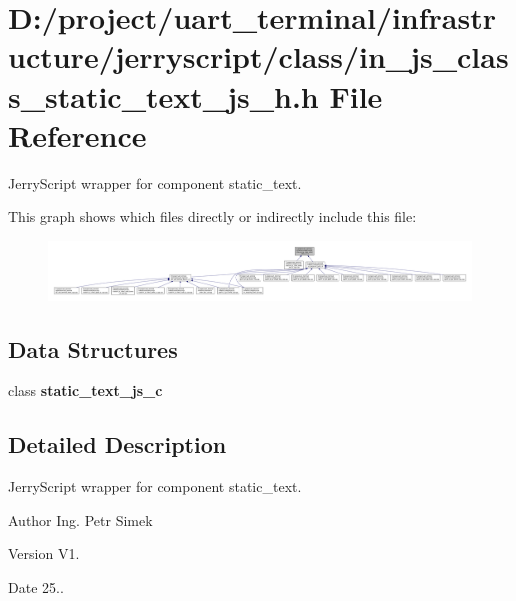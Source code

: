 \section{D\+:/project/uart\+\_\+terminal/infrastructure/jerryscript/class/in\+\_\+js\+\_\+class\+\_\+static\+\_\+text\+\_\+js\+\_\+h.h File Reference}
\label{in__js__class__static__text__js__h_8h}


Jerry\+Script wrapper for component static\+\_\+text.  


This graph shows which files directly or indirectly include this file\+:\nopagebreak
\begin{figure}[H]
\begin{center}
\leavevmode
\includegraphics[width=350pt]{in__js__class__static__text__js__h_8h__dep__incl}
\end{center}
\end{figure}
\subsection*{Data Structures}
\begin{DoxyCompactItemize}
\item 
class \textbf{ static\+\_\+text\+\_\+js\+\_\+c}
\end{DoxyCompactItemize}


\subsection{Detailed Description}
Jerry\+Script wrapper for component static\+\_\+text. 

\begin{DoxyAuthor}{Author}
Ing. Petr Simek 
\end{DoxyAuthor}
\begin{DoxyVersion}{Version}
V1. 
\end{DoxyVersion}
\begin{DoxyDate}{Date}
25.. 
\end{DoxyDate}
